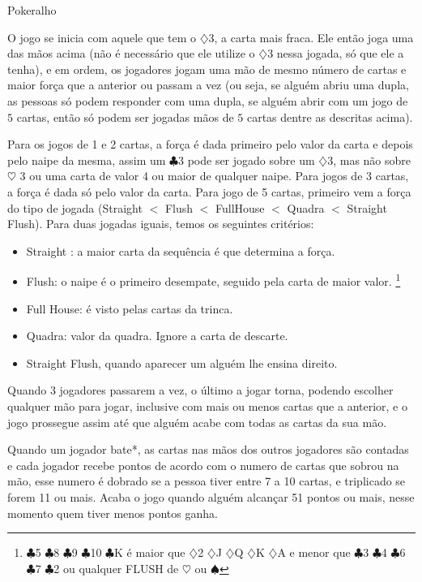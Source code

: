 \begin{subsecao}{Pokeralho}
\begin{itemize}
\end{itemize}

O jogo se inicia com aquele que tem o $\diamondsuit$3, a carta mais fraca. Ele
então joga uma das mãos acima (não é necessário que ele utilize
o $\diamondsuit$3 nessa jogada, só que ele a tenha), e em ordem, os jogadores
jogam uma mão de mesmo número de cartas e maior força que a anterior ou passam
a vez (ou seja, se alguém abriu uma dupla, as pessoas só podem responder com
uma dupla, se alguém abrir com um jogo de $5$ cartas, então só podem ser
jogadas mãos de $5$ cartas dentre as descritas acima). 

Para os jogos de 1 e 2 cartas, a força é dada primeiro pelo valor da carta e
depois pelo naipe da mesma, assim um $\clubsuit$3  pode ser jogado sobre
um $\diamondsuit$3, mas não sobre $\heartsuit$ 3 ou uma carta de valor 4 ou
maior de qualquer naipe. Para jogos de 3 cartas, a força é dada só pelo valor
da carta. Para jogo de 5 cartas, primeiro vem a força do tipo de
jogada (Straight $<$ Flush $<$ FullHouse $<$ Quadra $<$ Straight Flush). Para duas
jogadas iguais, temos os seguintes critérios:
\begin{itemize}
	\item Straight : a maior carta da sequência é que determina a força.
	\item Flush: o naipe é o primeiro desempate, seguido pela carta de maior
valor.  \footnote{ $\clubsuit$5 $\clubsuit$8 $\clubsuit$9 $\clubsuit$10 $\clubsuit$K é
maior que $\diamondsuit$2 $\diamondsuit$J $\diamondsuit$Q $\diamondsuit$K
$\diamondsuit$A e menor que $\clubsuit$3 $\clubsuit$4 $\clubsuit$6 $\clubsuit$7
$\clubsuit$2 ou qualquer FLUSH de $\heartsuit$  ou $\spadesuit$ }
	\item Full House: é visto pelas cartas da trinca.	
	\item Quadra: valor da quadra. Ignore a carta de descarte.
	\item Straight Flush, quando aparecer um alguém lhe ensina direito.
\end{itemize}

Quando 3 jogadores passarem a vez, o último a jogar torna, podendo escolher
qualquer mão para jogar, inclusive com mais ou menos cartas que a anterior, e o
jogo prossegue assim até que alguém acabe com todas as cartas da sua mão. 

Quando um jogador bate*, as cartas nas mãos dos outros jogadores são contadas e
cada jogador recebe pontos de acordo com o numero de cartas que sobrou na mão,
esse numero é dobrado se a pessoa tiver entre 7 a 10 cartas, e triplicado se
forem 11 ou mais. Acaba o jogo quando alguém alcançar 51 pontos ou mais, nesse
momento quem tiver menos pontos ganha.


\end{subsecao}
